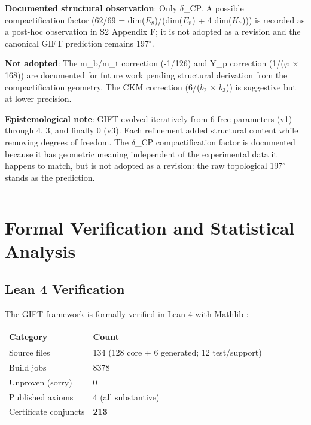 \documentclass[11pt,a4paper]{article}
\begin{document}
\textbf{Documented structural observation}: Only \(\delta\)\_CP. A possible compactification factor (62/69 = dim(\(E_{8}\))/(dim(\(E_{8}\)) + 4 dim(\(K_{7}\)))) is recorded as a post-hoc observation in S2 Appendix F; it is not adopted as a revision and the canonical GIFT prediction remains 197\({}^{\circ}\).

\textbf{Not adopted}: The m\_b/m\_t correction (-1/126) and Y\_p
correction (1/(\(\varphi\) \(\times\) 168)) are documented for future
work pending structural derivation from the compactification geometry.
The CKM correction (6/(\(b_{2}\) \(\times\) \(b_{3}\))) is suggestive
but at lower precision.

\textbf{Epistemological note}: GIFT evolved iteratively from 6 free
parameters (v1) through 4, 3, and finally 0 (v3). Each refinement added
structural content while removing degrees of freedom. The \(\delta\)\_CP
compactification factor is documented because it has geometric meaning
independent of the experimental data it happens to match, but is not
adopted as a revision: the raw topological 197\({}^{\circ}\) stands
as the prediction.

\noindent

\rule{\textwidth}{0.2pt}

\section{Formal Verification and Statistical Analysis}

\subsection{Lean 4 Verification}

The GIFT framework is formally verified in Lean 4 \cite{28} with Mathlib
\cite{29}:

\begin{longtable}[]{@{}ll@{}}
\toprule\noalign{}
Category & Count \\
\midrule\noalign{}
\endhead
\bottomrule\noalign{}
\endlastfoot
Source files & 134 (128 core + 6 generated; 12 test/support) \\
Build jobs & 8378 \\
Unproven (sorry) & 0 \\
Published axioms & 4 (all substantive) \\
Certificate conjuncts & \textbf{213} \\
\end{longtable}
\end{document}
